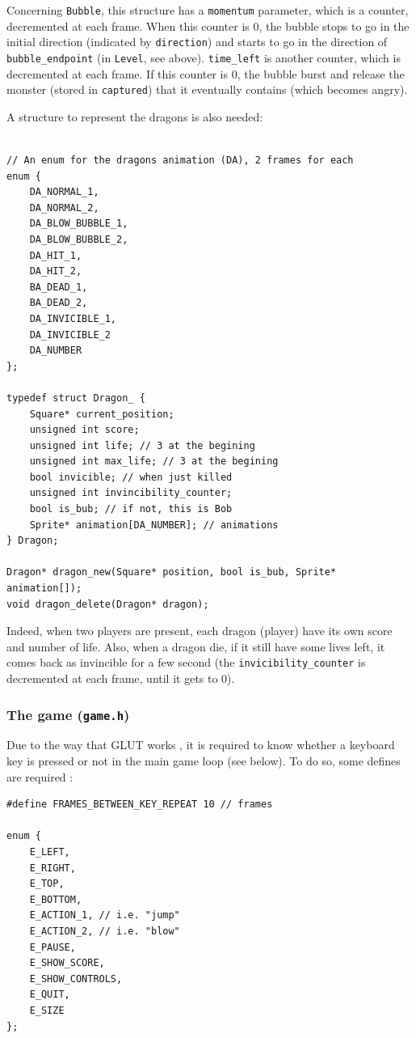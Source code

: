 \documentclass[12pt,a4paper]{article}
\begin{document}
Concerning \texttt{Bubble}, this structure has a \texttt{momentum} parameter, which is a counter, decremented at each frame. When this counter is 0, the bubble stops to go in the initial direction (indicated by \texttt{direction}) and starts to go in the direction of \texttt{bubble_endpoint} (in \texttt{Level}, see above). \texttt{time_left} is another counter, which is decremented at each frame. If this counter is 0, the bubble burst and release the monster (stored in \texttt{captured}) that it eventually contains (which becomes angry).

A structure to represent the dragons is also needed:

\begin{verbatim}

// An enum for the dragons animation (DA), 2 frames for each
enum {
	DA_NORMAL_1,
	DA_NORMAL_2,
	DA_BLOW_BUBBLE_1,
	DA_BLOW_BUBBLE_2,
	DA_HIT_1,
	DA_HIT_2,
	BA_DEAD_1,
	BA_DEAD_2,
	DA_INVICIBLE_1,
	DA_INVICIBLE_2
	DA_NUMBER
};

typedef struct Dragon_ {
	Square* current_position;
	unsigned int score;
	unsigned int life; // 3 at the begining
	unsigned int max_life; // 3 at the begining
	bool invicible; // when just killed
	unsigned int invincibility_counter;
	bool is_bub; // if not, this is Bob
	Sprite* animation[DA_NUMBER]; // animations
} Dragon;

Dragon* dragon_new(Square* position, bool is_bub, Sprite* animation[]);
void dragon_delete(Dragon* dragon);
\end{verbatim}

Indeed, when two players are present, each dragon (player) have its own score and number of life. Also, when a dragon die, if it still have some lives left, it comes back as invincible for a few second (the \texttt{invicibility_counter} is decremented at each frame, until it gets to 0).

\subsubsection{The game (\texttt{game.h})}

Due to the way that GLUT works \cite{freeglut},  it is required to know whether a keyboard key is pressed or not in the main game loop (see below). To do so, some defines are required :\begin{verbatim}
#define FRAMES_BETWEEN_KEY_REPEAT 10 // frames

enum {
	E_LEFT,
	E_RIGHT,
	E_TOP,
	E_BOTTOM,
	E_ACTION_1, // i.e. "jump"
	E_ACTION_2, // i.e. "blow"
	E_PAUSE,
	E_SHOW_SCORE,
	E_SHOW_CONTROLS,
	E_QUIT,
	E_SIZE
};
\end{verbatim}
\end{document}
